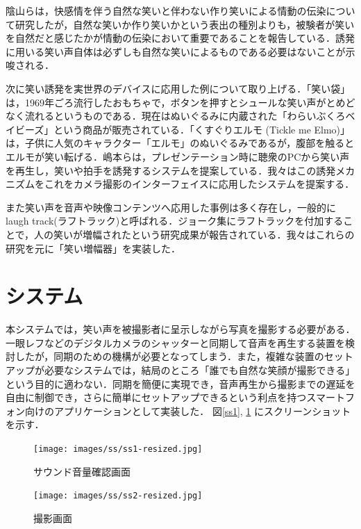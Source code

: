 \documentclass[submit,techreq]{ec2014}
\begin{document}
陰山らは，快感情を伴う自然な笑いと伴わない作り笑いによる情動の伝染について研究したが，自然な笑いか作り笑いかという表出の種別よりも，被験者が笑いを自然だと感じたかが情動の伝染において重要であることを報告している\cite{蔭山2005}．誘発に用いる笑い声自体は必ずしも自然な笑いによるものである必要はないことが示唆される．

次に笑い誘発を実世界のデバイスに応用した例について取り上げる．「笑い袋」は，1969年ごろ流行したおもちゃで，ボタンを押すとシュールな笑い声がとめどなく流れるというものである．現在はぬいぐるみに内蔵された「わらいぶくろベイビーズ」という商品が販売されている\cite{waraibukurobabies}．「くすぐりエルモ (Tickle me Elmo)」\cite{ticklemeelmo}は，子供に人気のキャラクター「エルモ」のぬいぐるみであるが，腹部を触るとエルモが笑い転げる．嶋本らは，プレゼンテーション時に聴衆のPCから笑い声を再生し，笑いや拍手を誘発するシステムを提案している\cite{shimamoto2013}．我々はこの誘発メカニズムをこれをカメラ撮影のインターフェイスに応用したシステムを提案する．

また笑い声を音声や映像コンテンツへ応用した事例は多く存在し，一般的にlaugh track(ラフトラック)と呼ばれる．ジョーク集にラフトラックを付加することで，人の笑いが増幅されたという研究成果が報告されている\cite{chapman1973funniness}．我々はこれらの研究を元に「笑い増幅器」を実装した\cite{fukushima2010}．



\section{システム}

本システムでは，笑い声を被撮影者に呈示しながら写真を撮影する必要がある．一眼レフなどのデジタルカメラのシャッターと同期して音声を再生する装置を検討したが，同期のための機構が必要となってしまう．また，複雑な装置のセットアップが必要なシステムでは，結局のところ「誰でも自然な笑顔が撮影できる」という目的に適わない．同期を簡便に実現でき，音声再生から撮影までの遅延を自由に制御でき，さらに簡単にセットアップできるという利点を持つスマートフォン向けのアプリケーションとして実装した．
図\ref{ss1}, \ref{ss2} にスクリーンショットを示す．

\begin{figure}[h] 
\begin{minipage}{0.49\columnwidth}
\begin{center}
\texttt{[image: images/ss/ss1-resized.jpg]}
\caption{サウンド音量確認画面}
\label{ss1}
\end{center}
\end{minipage}
\begin{minipage}{0.49\columnwidth}
\begin{center}
\texttt{[image: images/ss/ss2-resized.jpg]}
\caption{撮影画面}
\label{ss2}
\end{center}
\end{minipage}
\end{figure}
\end{document}
